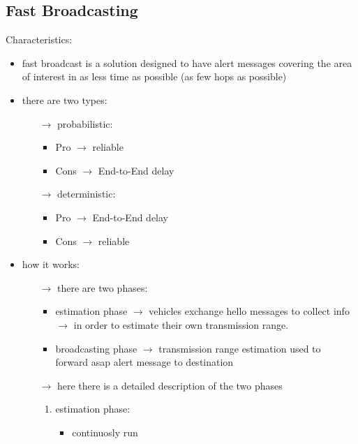 \subsection{Fast Broadcasting}
Characteristics:
\begin{itemize}
    \item fast broadcast is a solution designed to have alert messages covering
    the area of interest in as less time as possible (as few hops as possible)
    \item there are two types:
    \begin{itemize}
        \item[$\rightarrow$] probabilistic:
        \begin{itemize}
            \item Pro $\rightarrow$ reliable
            \item Cons $\rightarrow$ End-to-End delay
        \end{itemize}
        \item[$\rightarrow$] deterministic:
        \begin{itemize}
            \item Pro $\rightarrow$ End-to-End delay
            \item Cons $\rightarrow$ reliable
        \end{itemize} 
    \end{itemize}
    \item how it works:
    \begin{itemize}
        \item[$\rightarrow$] there are two phases:
        \begin{itemize}
            \item estimation phase $\rightarrow$ vehicles exchange hello
            messages to collect info $\rightarrow$ in order to estimate
            their own transmission range.
            \item broadcasting phase $\rightarrow$ transmission range estimation used
            to\\forward asap alert message to destination
        \end{itemize}
        \item[$\rightarrow$] here there is a detailed description of the two phases
        \begin{enumerate}
            \item estimation phase:
            \begin{itemize}
                \item continuosly run

\end{itemize}
\end{enumerate}
\end{itemize}
\end{itemize}
